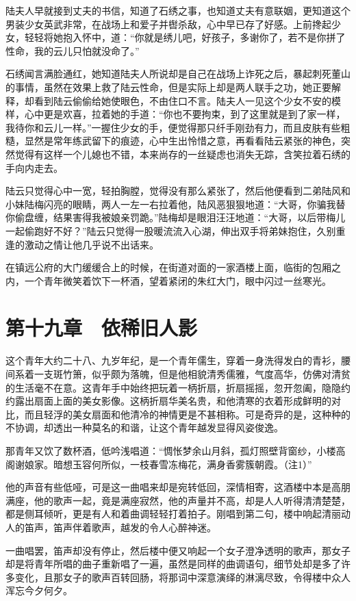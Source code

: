 陆夫人早就接到丈夫的书信，知道了石绣之事，也知道丈夫有意联姻，更知道这个男装少女英武非常，在战场上和爱子并辔杀敌，心中早已存了好感。上前搀起少女，轻轻将她抱入怀中，道：“你就是绣儿吧，好孩子，多谢你了，若不是你拼了性命，我的云儿只怕就没命了。”

石绣闻言满脸通红，她知道陆夫人所说却是自己在战场上诈死之后，暴起刺死董山的事情，虽然在效果上救了陆云性命，但是实际上却是两人联手之功，她正要解释，却看到陆云偷偷给她使眼色，不由住口不言。陆夫人一见这个少女不安的模样，心中更是欢喜，拉着她的手道：“你也不要拘束，到了这里就是到了家一样，我待你和云儿一样。”一握住少女的手，便觉得那只纤手刚劲有力，而且皮肤有些粗糙，显然是常年练武留下的痕迹，心中生出怜惜之意，再看看陆云紧张的神色，突然觉得有这样一个儿媳也不错，本来尚存的一丝疑虑也消失无踪，含笑拉着石绣的手向内走去。

陆云只觉得心中一宽，轻拍胸膛，觉得没有那么紧张了，然后他便看到二弟陆风和小妹陆梅闪亮的眼睛，两人一左一右拉着他，陆风恶狠狠地道：“大哥，你骗我替你偷盘缠，结果害得我被娘亲罚跪。”陆梅却是眼泪汪汪地道：“大哥，以后带梅儿一起偷跑好不好？”陆云只觉得一股暖流流入心湖，伸出双手将弟妹抱住，久别重逢的激动之情让他几乎说不出话来。

在镇远公府的大门缓缓合上的时候，在街道对面的一家酒楼上面，临街的包厢之内，一个青年微笑着饮下一杯酒，望着紧闭的朱红大门，眼中闪过一丝寒光。

\chapter{第十九章　依稀旧人影}

这个青年大约二十八、九岁年纪，是一个青年儒生，穿着一身洗得发白的青衫，腰间系着一支斑竹箫，似乎颇为落魄，但是他相貌清秀儒雅，气度高华，仿佛对清贫的生活毫不在意。这青年手中始终把玩着一柄折扇，折扇摇摇，忽开忽阖，隐隐约约露出扇面上面的美女影像。这柄折扇华美名贵，和他清寒的衣着形成鲜明的对比，而且轻浮的美女扇面和他清冷的神情更是不甚相称。可是奇异的是，这种种的不协调，却透出一种莫名的和谐，让这个青年越发显得风姿俊逸。

那青年又饮了数杯酒，低吟浅唱道：“惆怅梦余山月斜，孤灯照壁背窗纱，小楼高阁谢娘家。暗想玉容何所似，一枝春雪冻梅花，满身香雾簇朝霞。（注1）”

他的声音有些低哑，可是这一曲唱来却是宛转低回，深情相寄，这酒楼中本是高朋满座，他的歌声一起，竟是满座寂然，他的声量并不高，却是人人听得清清楚楚，都是侧耳倾听，更是有人和着曲调轻轻打着拍子。刚唱到第二句，楼中响起清丽动人的笛声，笛声伴着歌声，越发的令人心醉神迷。

一曲唱罢，笛声却没有停止，然后楼中便又响起一个女子澄净透明的歌声，那女子却是将青年所唱的曲子重新唱了一遍，虽然是同样的曲调语句，细节处却是多了许多变化，且那女子的歌声百转回肠，将那词中深意演绎的淋漓尽致，令得楼中众人浑忘今夕何夕。

